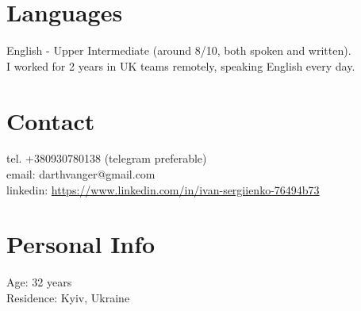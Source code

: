 \documentclass[a4paper, 14pt]{article}
\begin{document}
\section{Languages}
	English - Upper Intermediate (around 8/10, both spoken and written). \\
  I worked for 2 years in UK teams remotely, speaking English every day.

\section{Contact}
	tel. +380930780138 (telegram preferable) \\
	email: darthvanger@gmail.com \\
  linkedin: \url{https://www.linkedin.com/in/ivan-sergiienko-76494b73}

\section{Personal Info}
	Age: 32 years \\
  Residence: Kyiv, Ukraine
\end{document}
